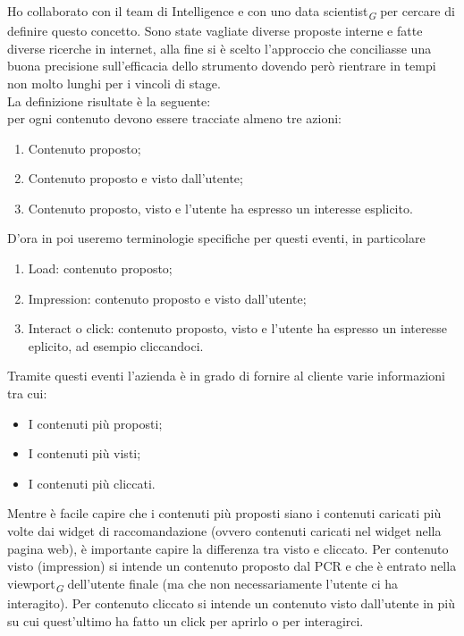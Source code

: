 \documentclass[a4paper, 12pt, twoside, openright]{book}
\newcommand{\gloss}[1]{#1\textsubscript{\textit{\tiny{G}}}}
\begin{document}
Ho collaborato con il team di Intelligence e con uno \gloss{data scientist} per cercare di definire questo concetto. Sono state vagliate diverse proposte interne e fatte diverse ricerche in internet, alla fine si è scelto l'approccio che conciliasse una buona precisione sull'efficacia dello strumento dovendo però rientrare in tempi non molto lunghi per i vincoli di stage.\\
La definizione risultate è la seguente:\\
per ogni contenuto devono essere tracciate almeno tre azioni:
\begin{enumerate}
\item Contenuto proposto;
\item Contenuto proposto e visto dall'utente;
\item Contenuto proposto, visto e l'utente ha espresso un interesse esplicito.
\end{enumerate}
D'ora in poi useremo terminologie specifiche per questi eventi, in particolare
\begin{enumerate}
\item Load: contenuto proposto;
\item Impression: contenuto proposto e visto dall'utente;
\item Interact o click: contenuto proposto, visto e l'utente ha espresso un interesse eplicito, ad esempio cliccandoci.
\end{enumerate}
Tramite questi eventi l'azienda è in grado di fornire al cliente varie informazioni tra cui:
\begin{itemize}
\item I contenuti più proposti;
\item I contenuti più visti;
\item I contenuti più cliccati.
\end{itemize}

Mentre è facile capire che i contenuti più proposti siano i contenuti caricati più volte dai widget di raccomandazione (ovvero contenuti caricati nel widget nella pagina web), è importante capire la differenza tra visto e cliccato. Per contenuto visto (impression) si intende un contenuto proposto dal PCR e che è entrato nella \gloss{viewport} dell'utente finale (ma che non necessariamente l'utente ci ha interagito). Per contenuto cliccato si intende un contenuto visto dall'utente in più su cui quest'ultimo ha fatto un click per 
aprirlo o per interagirci.\\
\end{document}
